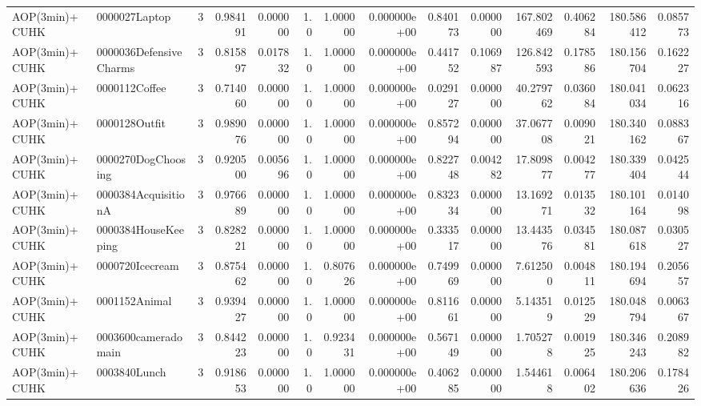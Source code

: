 \begin{tabular}{llrr|r|rr|rr|rr|rrr}
           AOP(3min)+CUHK &          0000027Laptop &       3 & 0.984191 & 0.000000 &  1.0 &      1.000000 & 0.000000e+00 &      0.840173 & 0.000000 &    167.802469 &    0.406284 &   180.586412 &    0.085773 \\
           AOP(3min)+CUHK & 0000036DefensiveCharms &       3 & 0.815897 & 0.017832 &  1.0 &      1.000000 & 0.000000e+00 &      0.441752 & 0.106987 &    126.842593 &    0.178586 &   180.156704 &    0.162227 \\
           AOP(3min)+CUHK &          0000112Coffee &       3 & 0.714060 & 0.000000 &  1.0 &      1.000000 & 0.000000e+00 &      0.029127 & 0.000000 &     40.279762 &    0.036084 &   180.041034 &    0.062316 \\
           AOP(3min)+CUHK &          0000128Outfit &       3 & 0.989076 & 0.000000 &  1.0 &      1.000000 & 0.000000e+00 &      0.857294 & 0.000000 &     37.067708 &    0.009021 &   180.340162 &    0.088367 \\
           AOP(3min)+CUHK &     0000270DogChoosing &       3 & 0.920500 & 0.005696 &  1.0 &      1.000000 & 0.000000e+00 &      0.822748 & 0.004282 &     17.809877 &    0.004277 &   180.339404 &    0.042544 \\
           AOP(3min)+CUHK &    0000384AcquisitionA &       3 & 0.976689 & 0.000000 &  1.0 &      1.000000 & 0.000000e+00 &      0.832334 & 0.000000 &     13.169271 &    0.013532 &   180.101164 &    0.014098 \\
           AOP(3min)+CUHK &    0000384HouseKeeping &       3 & 0.828221 & 0.000000 &  1.0 &      1.000000 & 0.000000e+00 &      0.333517 & 0.000000 &     13.443576 &    0.034581 &   180.087618 &    0.030527 \\
           AOP(3min)+CUHK &        0000720Icecream &       3 & 0.875462 & 0.000000 &  1.0 &      0.807626 & 0.000000e+00 &      0.749969 & 0.000000 &      7.612500 &    0.004811 &   180.194694 &    0.205657 \\
           AOP(3min)+CUHK &          0001152Animal &       3 & 0.939427 & 0.000000 &  1.0 &      1.000000 & 0.000000e+00 &      0.811661 & 0.000000 &      5.143519 &    0.012529 &   180.048794 &    0.006367 \\
           AOP(3min)+CUHK &    0003600cameradomain &       3 & 0.844223 & 0.000000 &  1.0 &      0.923431 & 0.000000e+00 &      0.567149 & 0.000000 &      1.705278 &    0.001925 &   180.346243 &    0.208982 \\
           AOP(3min)+CUHK &           0003840Lunch &       3 & 0.918653 & 0.000000 &  1.0 &      1.000000 & 0.000000e+00 &      0.406285 & 0.000000 &      1.544618 &    0.006402 &   180.206636 &    0.178426 \\

\end{tabular}
